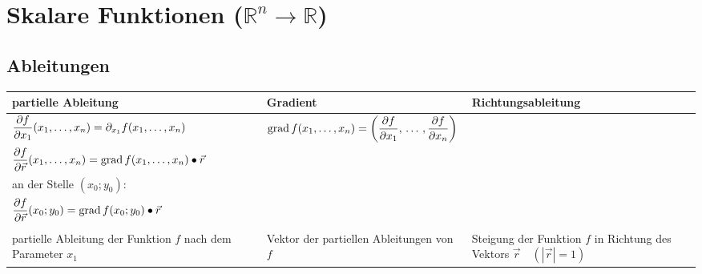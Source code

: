 \section{Skalare Funktionen ($\mathbb{R}^n \rightarrow \mathbb{R}$)
}

\subsection{Ableitungen}
\begin{tabular}{|l|l|l|}
\hline
\textbf{partielle Ableitung} & \textbf{Gradient} & \textbf{Richtungsableitung}\\
\hline
\begin{minipage}{5.5cm}
	\vspace{0.2cm}
	$\dfrac{\partial f}{\partial x_1}(x_1,\ldots,x_n)= \partial_{x_1} f(x_1,\ldots,x_n)$
	\vspace{0.2cm}
\end{minipage}&
\begin{minipage}{6cm}
	$\operatorname{grad} f(x_1,\ldots,x_n)= \left(\dfrac{\partial f}{\partial x_1}, \,\ldots\,,
	\dfrac{\partial f}{\partial x_n}\right)$ \end{minipage}&
\begin{minipage}{6.5cm}
	\vspace{0.1cm}
	 Allgemein:\\\vspace{0.1cm}
  $\dfrac{\partial f}{\partial \vec{r}}(x_1, \ldots, x_n)=\operatorname{grad} f(x_1, \ldots, x_n)
  \bullet \vec{r}$\\
  \vspace{0.3cm}
	an der Stelle $(x_0;y_0)$:\\\vspace{0.1cm}
	$\dfrac{\partial f}{\partial \vec{r}}(x_0;y_0)=\operatorname{grad} f(x_0;y_0) \bullet \vec{r}$\\

	
	\vspace{0.1cm}
\end{minipage}\\
\hline
\begin{minipage}{5.5cm}
	\vspace{0.2cm}
	partielle Ableitung der Funktion $f$ nach dem Parameter $x_1$
	\vspace{0.2cm}
\end{minipage}&
\begin{minipage}{5.5cm}
	Vektor der partiellen Ableitungen von $f$
\end{minipage}&
\begin{minipage}{5.5cm}
	Steigung der Funktion $f$ in Richtung des Vektors $\vec{r}\quad (|\vec{r}|=1)$
\end{minipage}\\
\hline
\end{tabular}

